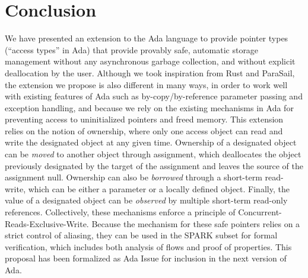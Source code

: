 \documentclass{llncs}
\begin{document}
\section{Conclusion}
We have presented an extension to the Ada language to provide pointer types (``access types'' in Ada) that provide provably safe, automatic
storage management without any asynchronous garbage collection, and without explicit deallocation by the user. Although we took inspiration
from Rust and ParaSail, the extension we propose is also different in many ways, in order to work well with existing features of Ada such
as by-copy/by-reference parameter passing and exception handling, and because we rely on the existing mechanisms in Ada for preventing access
to uninitialized pointers and freed memory. 
This extension relies on the notion of ownership, where only one access object can read and write the designated object at any given time.
Ownership of a designated object can be \textit{moved} to another object through assignment, which deallocates the object previously designated
by the target of the assignment and leaves the source of the assignment null. Ownership can also be \textit{borrowed} through a short-term read-write,
which can be either a parameter or a locally defined object. Finally, the value of a designated object can be \textit{observed} by multiple short-term
read-only references. Collectively, these mechanisms enforce a principle of Concurrent-Reads-Exclusive-Write.
Because the mechanism for these safe pointers relies on a strict control of aliasing, they can be used in the SPARK subset for formal verification, which
includes both analysis of flows and proof of properties. 
This proposal has been formalized as Ada Issue \cite{AI2017} for inclusion in the next version of Ada.

\printbibliography[title={References}]
\end{document}
